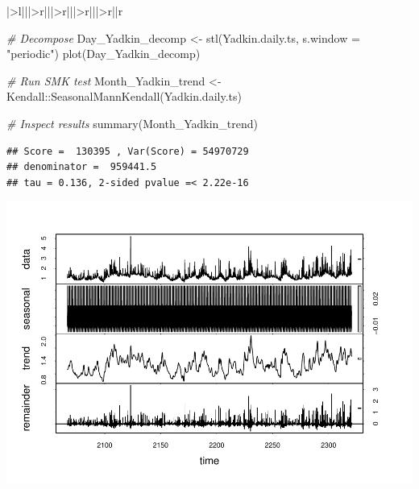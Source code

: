 \documentclass[
  12pt,
]{article}
\newenvironment{Shaded}{\begin{snugshade}}{\end{snugshade}}
\newcommand{\AttributeTok}[1]{\textcolor[rgb]{0.77,0.63,0.00}{#1}}
\newcommand{\CommentTok}[1]{\textcolor[rgb]{0.56,0.35,0.01}{\textit{#1}}}
\newcommand{\DecValTok}[1]{\textcolor[rgb]{0.00,0.00,0.81}{#1}}
\newcommand{\DocumentationTok}[1]{\textcolor[rgb]{0.56,0.35,0.01}{\textbf{\textit{#1}}}}
\newcommand{\FunctionTok}[1]{\textcolor[rgb]{0.00,0.00,0.00}{#1}}
\newcommand{\NormalTok}[1]{#1}
\newcommand{\OtherTok}[1]{\textcolor[rgb]{0.56,0.35,0.01}{#1}}
\newcommand{\SpecialCharTok}[1]{\textcolor[rgb]{0.00,0.00,0.00}{#1}}
\newcommand{\StringTok}[1]{\textcolor[rgb]{0.31,0.60,0.02}{#1}}
\begin{document}
\begin{table}
\begin{tabular}[t]{|>{}l|||>{}r|||>{}r|||>{}r|||>{}r||r}
\begin{Shaded}
\begin{Highlighting}[]
\CommentTok{\# Decompose}
\NormalTok{Day\_Yadkin\_decomp }\OtherTok{\textless{}{-}} \FunctionTok{stl}\NormalTok{(Yadkin.daily.ts, }\AttributeTok{s.window =} \StringTok{"periodic"}\NormalTok{)}
\FunctionTok{plot}\NormalTok{(Day\_Yadkin\_decomp)}

\CommentTok{\# Run SMK test}
\NormalTok{Month\_Yadkin\_trend }\OtherTok{\textless{}{-}}\NormalTok{ Kendall}\SpecialCharTok{::}\FunctionTok{SeasonalMannKendall}\NormalTok{(Yadkin.daily.ts)}

\CommentTok{\# Inspect results}
\FunctionTok{summary}\NormalTok{(Month\_Yadkin\_trend)}
\end{Highlighting}
\end{Shaded}

\begin{verbatim}
## Score =  130395 , Var(Score) = 54970729
## denominator =  959441.5
## tau = 0.136, 2-sided pvalue =< 2.22e-16
\end{verbatim}

\begin{Shaded}
\end{Shaded}

\includegraphics{Project_Template_files/figure-latex/TimeSeries-2.pdf}


\end{tabular}
\end{table}
\end{document}
